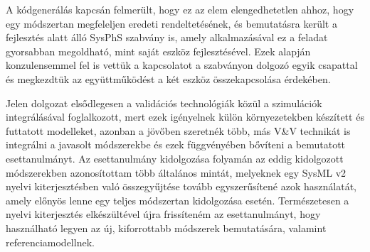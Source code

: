 A kódgenerálás kapcsán felmerült, hogy ez az elem elengedhetetlen ahhoz, hogy egy módszertan megfeleljen eredeti rendeltetésének, és bemutatásra került a fejlesztés alatt álló SysPhS szabvány is, amely alkalmazásával ez a feladat gyorsabban megoldható, mint saját eszköz fejlesztésével.
Ezek alapján konzulensemmel fel is vettük a kapcsolatot a szabványon dolgozó egyik csapattal és megkezdtük az együttműködést a két eszköz összekapcsolása érdekében.

Jelen dolgozat elsődlegesen a validációs technológiák közül a szimulációk integrálásával foglalkozott, mert ezek igényelnek külön környezetekben készített és futtatott modelleket, azonban a jövőben szeretnék több, más V\&V technikát is integrálni a javasolt módszerekbe és ezek függvényében bővíteni a bemutatott esettanulmányt.
Az esettanulmány kidolgozása folyamán az eddig kidolgozott módszerekben azonosítottam több általános mintát, melyeknek egy SysML v2 nyelvi kiterjesztésben való összegyűjtése tovább egyszerűsítené azok használatát, amely előnyös lenne egy teljes módszertan kidolgozása esetén. Természetesen a nyelvi kiterjesztés elkészültével újra frissíteném az esettanulmányt, hogy használható legyen az új, kiforrottabb módszerek bemutatására, valamint referenciamodellnek.